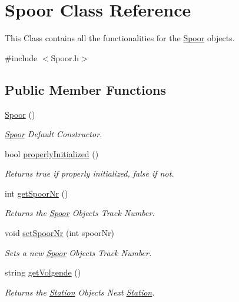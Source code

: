 \hypertarget{classSpoor}{}\section{Spoor Class Reference}
\label{classSpoor}


This Class contains all the functionalities for the \hyperlink{classSpoor}{Spoor} objects.  




{\ttfamily \#include $<$Spoor.\+h$>$}

\subsection*{Public Member Functions}
\begin{DoxyCompactItemize}
\item 
\hyperlink{classSpoor_a64778a4094d2d9cd3a08cbbef5a11787}{Spoor} ()
\begin{DoxyCompactList}\small\item\em \hyperlink{classSpoor}{Spoor} Default Constructor. \end{DoxyCompactList}\item 
bool \hyperlink{classSpoor_a31982084b33e5946f1e15844b084f62f}{properly\+Initialized} ()
\begin{DoxyCompactList}\small\item\em Returns true if properly initialized, false if not. \end{DoxyCompactList}\item 
int \hyperlink{classSpoor_a17c71f600581bc91b85c92d6628d14c5}{get\+Spoor\+Nr} ()
\begin{DoxyCompactList}\small\item\em Returns the \hyperlink{classSpoor}{Spoor} Object\textquotesingle{}s Track Number. \end{DoxyCompactList}\item 
void \hyperlink{classSpoor_af0c947d95aafed41f4fa3c5ec96d2e3c}{set\+Spoor\+Nr} (int spoor\+Nr)
\begin{DoxyCompactList}\small\item\em Sets a new \hyperlink{classSpoor}{Spoor} Object\textquotesingle{}s Track Number. \end{DoxyCompactList}\item 
string \hyperlink{classSpoor_af72fa63d73e10bb5d0bb0e15958260d5}{get\+Volgende} ()
\begin{DoxyCompactList}\small\item\em Returns the \hyperlink{classStation}{Station} Object\textquotesingle{}s Next \hyperlink{classStation}{Station}. \end{DoxyCompactList}\item 

\end{DoxyCompactItemize}

